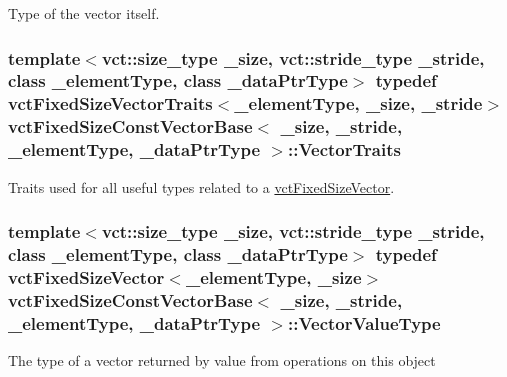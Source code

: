 Type of the vector itself. \hypertarget{classvct_fixed_size_const_vector_base_ac47f6db624303dee621bca2ec51aa75e}{
\subsubsection[{Vector\-Traits}]{\setlength{\rightskip}{0pt plus 5cm}template$<$vct\-::size\-\_\-type \-\_\-size, vct\-::stride\-\_\-type \-\_\-stride, class \-\_\-element\-Type, class \-\_\-data\-Ptr\-Type$>$ typedef {\bf vct\-Fixed\-Size\-Vector\-Traits}$<$\-\_\-element\-Type, \-\_\-size, \-\_\-stride$>$ {\bf vct\-Fixed\-Size\-Const\-Vector\-Base}$<$ \-\_\-size, \-\_\-stride, \-\_\-element\-Type, \-\_\-data\-Ptr\-Type $>$\-::{\bf Vector\-Traits}}}\label{classvct_fixed_size_const_vector_base_ac47f6db624303dee621bca2ec51aa75e}
Traits used for all useful types related to a \hyperlink{classvct_fixed_size_vector}{vct\-Fixed\-Size\-Vector}. \hypertarget{classvct_fixed_size_const_vector_base_a4de94a741a6bb9046e05754c32475ecd}{
\subsubsection[{Vector\-Value\-Type}]{\setlength{\rightskip}{0pt plus 5cm}template$<$vct\-::size\-\_\-type \-\_\-size, vct\-::stride\-\_\-type \-\_\-stride, class \-\_\-element\-Type, class \-\_\-data\-Ptr\-Type$>$ typedef {\bf vct\-Fixed\-Size\-Vector}$<$\-\_\-element\-Type, \-\_\-size$>$ {\bf vct\-Fixed\-Size\-Const\-Vector\-Base}$<$ \-\_\-size, \-\_\-stride, \-\_\-element\-Type, \-\_\-data\-Ptr\-Type $>$\-::{\bf Vector\-Value\-Type}}}\label{classvct_fixed_size_const_vector_base_a4de94a741a6bb9046e05754c32475ecd}
The type of a vector returned by value from operations on this object 

